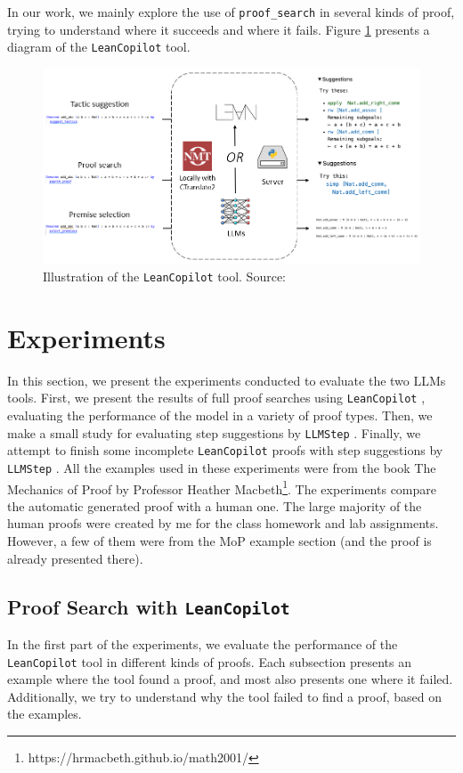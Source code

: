 \documentclass[12pt]{article}
\newcommand{\leancopilot}{\texttt{LeanCopilot} }
\newcommand{\llmstep}{\texttt{LLMStep} }
\begin{document}
In our work, we mainly explore the use of \texttt{proof\_search} in several kinds of proof, trying to understand where it succeeds and where it fails. Figure \ref{fig:tools-leancopilot} presents a diagram of the \leancopilot tool.

\begin{figure}[h]
  \centering
  \includegraphics[width=\linewidth]{figures/leancopilot.png}
  \caption{Illustration of the \leancopilot tool. Source: \cite{leancopilot}}
  \label{fig:tools-leancopilot}
\end{figure}

\section{Experiments} \label{sec:experiments}
In this section, we present the experiments conducted to evaluate the two LLMs tools. First, we present the results of full proof searches using \leancopilot, evaluating the performance of the model in a variety of proof types. Then, we make a small study for evaluating step suggestions by \llmstep. Finally, we attempt to finish some incomplete \leancopilot proofs with step suggestions by \llmstep. All the examples used in these experiments were from the book The Mechanics of Proof by Professor Heather Macbeth\footnote{https://hrmacbeth.github.io/math2001/}. The experiments compare the automatic generated proof with a human one. The large majority of the human proofs were created by me for the class homework and lab assignments. However, a few of them were from the MoP example section (and the proof is already presented there).

\subsection{Proof Search with \leancopilot}
In the first part of the experiments, we evaluate the performance of the \leancopilot tool in different kinds of proofs. Each subsection presents an example where the tool found a proof, and most also presents one where it failed. Additionally, we try to understand why the tool failed to find a proof, based on the examples.
\end{document}
